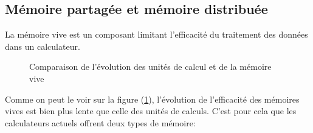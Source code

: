 \documentclass[fleqn,11pt]{article}
\begin{document}
\subsection{Mémoire partagée et mémoire distribuée}

La mémoire vive est un composant limitant l'efficacité du traitement des données dans un calculateur. 

\begin{figure}
\begin{center}
\end{center}
\caption{Comparaison de l'évolution des unités de calcul et de la mémoire vive}
\label{fig:compucram}
\end{figure}

Comme on peut le voir sur la figure (\ref {fig:compucram}), l'évolution de l'efficacité des mémoires vives est bien plus lente que celle des unités de calculs. C'est pour cela que 
les calculateurs actuels offrent deux types de mémoire:
\end{document}
